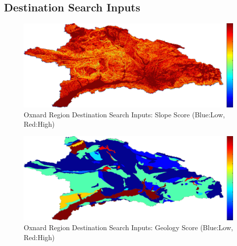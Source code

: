     \subsection{Destination Search Inputs}
    
        \begin{figure}[!h]
            \begin{center}
            \includegraphics[width=5.5in]{figures/Oxnard_Search_Slope.png}   
            \caption{Oxnard Region Destination Search Inputs: Slope Score (Blue:Low, Red:High)}
            \label{fig:Odsinputs_slope}
            \end{center}
        \end{figure}
        
        \begin{figure}[!h]
            \begin{center}
            \includegraphics[width=5.5in]{figures/Oxnard_Search_Geology.png}   
            \caption{Oxnard Region Destination Search Inputs: Geology Score (Blue:Low, Red:High)}
            \label{fig:Odsinputs_geology}
            \end{center}
        \end{figure}
    
